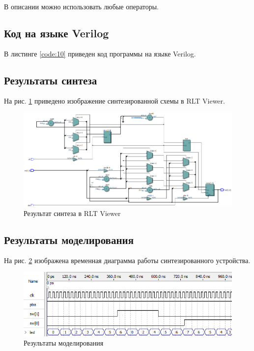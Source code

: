 В описании можно использовать любые операторы.

\subsection{Код на языке Verilog}

В листинге \ref{code:10} приведен код программы на языке Verilog.



\subsection{Результаты синтеза}

На рис. \ref{fig:elab5_2_rtl} приведено изображение синтезированной схемы в RLT Viewer.

\begin{figure}[H]
\begin{center}
	\includegraphics[width=\textwidth]{elab5_2_rtl}
	\caption{Результат синтеза в RLT Viewer}
	\label{fig:elab5_2_rtl}
\end{center}
\end{figure}

\subsection{Результаты моделирования}
\label{sec:elab5_2_modeling}

На рис. \ref{fig:elab5_2_modeling} изображена временная диаграмма работы синтезированного устройства. 

\begin{figure}[H]
\begin{center}
	\includegraphics[width=\textwidth]{elab5_2_modeling}
	\caption{Результаты моделирования}
	\label{fig:elab5_2_modeling}
\end{center}
\end{figure}

